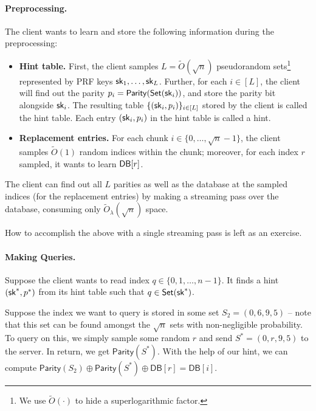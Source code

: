 \paragraph{Preprocessing.}
The client wants to learn and store the following information during the preprocessing:  
\begin{itemize}
\item 
{\bf Hint table.}
First, the client samples
$L = \widetilde{O}(\sqrt{n})$
pseudorandom sets\footnote{We use $\widetilde{O}(\cdot)$ to hide
a superlogarithmic factor.} represented by PRF keys ${\sf sk}_1, \ldots, {\sf sk}_L$.
Further, for each $i \in [L]$, the client will 
find out the parity 
$p_i = {\sf Parity}({\sf Set}({\sf sk}_i))$, and store the parity bit alongside ${\sf sk}_i$.
The resulting table $\{({\sf sk}_i, p_i)\}_{i \in [L]}$ 
stored by the client
is called the hint table.
Each entry $({\sf sk}_i, p_i)$ in the hint table is called a hint.
\item 
{\bf Replacement entries.}
For each chunk $i \in \{0, \ldots, \sqrt{n}-1\}$, the client
samples $\widetilde{O}(1)$
random indices within the chunk; moreover, for each index $r$ sampled,
it wants to learn ${\sf DB}[r]$.  
\end{itemize}

\begin{claim}
The client can find out all $L$ parities
as well as
the database at the sampled indices (for the replacement entries)
by making a streaming pass over the database, consuming
only $\widetilde{O}_\lambda(\sqrt{n})$ space.
\end{claim}
How to accomplish the above with a single streaming pass is left as an exercise.

\paragraph{Making Queries.}
Suppose the client wants to read index
$q \in \{0, 1, \ldots, n-1\}$.
It finds a hint $({\sf sk}^*, p^*)$
from its hint table such that $q \in {\sf Set}({\sf sk}^*)$.

Suppose the index we want to query is stored in some set $S_2 = (0, 6, 9, 5)$ -- note that this set can be found amongst the $\sqrt{n}$ sets with non-negligible probability. To query on this, we simply sample some random $r$ and send $S^* = (0, r, 9, 5)$ to the server. In return, we get $\mathsf{Parity}(S^*)$. With the help of our hint, we can compute $\mathsf{Parity}(S_2) \oplus \mathsf{Parity}(S^*) \oplus \mathsf{DB}[r] = \mathsf{DB}[i]$.





